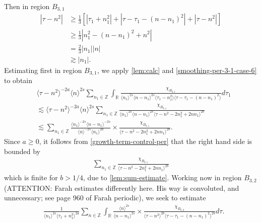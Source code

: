 \documentclass[12pt,reqno]{amsart}
\numberwithin{equation}{section}  %
\numberwithin{figure}{section}
\newcommand{\rr}{\mathbb{R}}
\newcommand{\zz}{\mathbb{Z}}
\theoremstyle{plain}
\theoremstyle{definition}
\theoremstyle{remark}
\begin{document}
Then in region $B_{3,1}$
\begin{equation}
\begin{split}
  | \tau - n^{2} |
  & \ge \frac{1}{3}\left[ | \tau_{1} + n_{1}^{2} | + | \tau -
  \tau_{1} - (n - n_{1})^{2}
  | + | \tau - n^{2} | \right]
  \\
  & \ge \frac{1}{3} |  n_{1}^{2} - (n - n_{1})^{2} + n^{2} |
  \\
  & = \frac{2}{3} | n_{1} | | n |
  \\
  & \gtrsim | n_{1} |.
\end{split}
\label{smoothing-per-3-1-case-6}
\end{equation}
%
%
Estimating first in region
$B_{3,1}$, we apply \autoref{lem:calc} and \eqref{smoothing-per-3-1-case-6}
to obtain
%
%
%
%
\begin{equation}
  \label{region-a31-case-6}
\begin{split}
& \langle \tau - n^{2}  \rangle ^{-2a} \langle n
    \rangle ^{2s}
    \sum_{n_{1} \in \zz} \int_{\rr} \frac{\chi_{B_{3,1}}}{ \langle n_{1} \rangle ^{2s} \langle n-n_{1} \rangle ^{2s} 
\langle \tau_{1} - n_{1}^{2}  \rangle \langle  \tau - \tau_{1} - (n -
n_{1})^{2}  \rangle}
d \tau_1 
\\
& \lesssim \langle \tau - n^{2} \rangle ^{-2a} \langle n \rangle ^{2s}
\sum_{n_{1} \in
\zz}  \frac{\chi_{B_{3,1}}}{\langle n_{1} \rangle ^{2s} \langle n - n_{1} \rangle
^{2s} \langle \tau - n^{2} - 2n_{1}^{2} + 2nn_{1}  \rangle ^{2b}}
\\
& \lesssim 
\sum_{n_{1} \in
\zz}  \frac{\langle n_1 \rangle ^{-2s} \langle n - n_{1} \rangle ^{-2s}}{\langle
n \rangle ^{-2s} \langle n_{1} \rangle
^{2a}} \times \frac{\chi_{B_{3,1}}}{\langle \tau - n^{2} - 2n_{1}^{2} + 2nn_{1}
\rangle ^{2b}}.
\end{split}
\end{equation}
%
%
Since $a \ge 0$, it follows from \eqref{growth-term-control-per} that the right
hand side is bounded by
%
%
%
%
\begin{equation*}
\begin{split}
\sum_{n_{1} \in
\zz} \frac{\chi_{B_{3,1}}}{\langle \tau - n^{2} - 2n_{1}^{2} + 2nn_{1}
\rangle ^{2b}}
\end{split}
\end{equation*}
%
%
%
%
%
%
which is finite for $b > 1/4$, due to \autoref{lem:sum-estimate}. 
Working now in region $B_{3,2}$ (ATTENTION: Farah estimates differently here. His
way is convoluted, and unnecessary; see page 960 of Farah periodic), we seek to estimate 
\begin{equation}
  \label{region-B-3-split-3}
\begin{split}
  &  \frac{1}{\langle n_{1} \rangle ^{2s}
  \langle \tau_{1} + n_{1}^{2} \rangle
  ^{2a}} \sum_{n \in \zz} \int_{\rr} \frac{\langle n \rangle ^{2s}}{\langle
  n - n_{1}\rangle ^{2s}}  \times \frac{\chi_{B_{3,2}}}{\langle
  \tau - n^{2} \rangle ^{2b} \langle \tau - \tau_{1} - (n - n_{1})^{2} \rangle
  ^{2b}} d \tau.
\end{split}
\end{equation}
\end{document}
